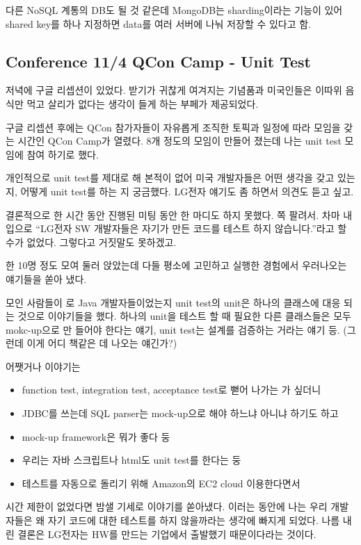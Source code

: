 \documentclass[a4paper]{article}
\begin{document}
다른 NoSQL 계통의 DB도 될 것 같은데 MongoDB는 sharding이라는 기능이
있어 shared key를 하나 지정하면 data를 여러 서버에 나눠 저장할 수
있다고 함.
 
\subsection{Conference 11/4 QCon Camp - Unit Test}
 
저녁에 구글 리셉션이 있었다. 받기가 귀찮게 여겨지는 기념품과 미국인들은
이따위 음식만 먹고 살리가 없다는 생각이 들게 하는 부페가 제공되었다.
 
구글 리셉션 후에는 QCon 참가자들이 자유롭게 조직한 토픽과 일정에 따라
모임을 갖는 시간인 QCon Camp가 열렸다. 8개 정도의 모임이 만들어 졌는데
나는 unit test 모임에 참여 하기로 했다.
 
개인적으로 unit test를 제대로 해 본적이 없어 미국 개발자들은 어떤
생각을 갖고 있는 지, 어떻게 unit test를 하는 지 궁금했다.
LG전자 얘기도 좀 하면서 의견도 듣고 싶고.
 
결론적으로 한 시간 동안 진행된 미팅 동안 한 마디도 하지 못했다. 쪽
팔려서. 차마 내 입으로 ``LG전자 SW 개발자들은 자기가 만든 코드를 테스트
하지 않습니다.''라고 할 수가 없었다. 그렇다고 거짓말도 못하겠고.
 
한 10명 정도 모여 둘러 앉았는데 다들 평소에 고민하고 실행한 경험에서
우러나오는 얘기들을 쏟아 냈다.
 
모인 사람들이 로 Java 개발자들이었는지 unit test의 unit은 하나의
클래스에 대응 되는 것으로 이야기들을 했다. 하나의 unit을 테스트 할 때
필요한 다른 클래스들은 모두 mokc-up으로 만 들어야 한다는 얘기, unit
test는 설계를 검증하는 거라는 얘기 등.
(그런데 이게 어디 책같은 데 나오는 얘긴가?)
 
어쨋거나 이야기는 
\begin{itemize}
\item function test, integration test, acceptance test로 뻗어 나가는 가 싶더니 
\item JDBC를 쓰는데 SQL parser는  mock-up으로 해야 하느냐 아니냐 하기도 하고 
\item mock-up framework은 뭐가 좋다 둥 
\item 우리는 자바 스크립트나 html도 unit test를 한다는 둥
\item 테스트를 자동으로 돌리기 위해 Amazon의 EC2 cloud 이용한다면서 
\end{itemize}
 
시간 제한이 없었다면 밤샐 기세로 이야기를 쏟아냈다. 이러는 동안에 나는
우리 개발자들은 왜 자기 코드에 대한 테스트를 하지 않을까라는 생각에
빠지게 되었다. 나름 내린 결론은 LG전자는 HW를 만드는 기업에서 출발했기
때문이다라는 것이다.
 
\end{document}
